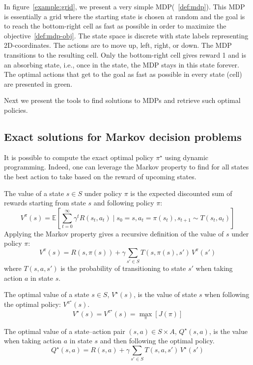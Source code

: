 In figure~\ref{example:grid}, we present a very simple MDP(~\ref{def:mdp}).
This MDP is essentially a grid where the starting state is chosen at random and the goal is to reach the bottom-right cell as fast as possible in order to maximize the objective~\ref{def:mdp-obj}.
The state space is discrete with state labels representing 2D-coordinates.
The actions are to move up, left, right, or down. The MDP transitions to the resulting cell. 
Only the bottom-right cell gives reward 1 and is an absorbing state, i.e., once in the state, the MDP stays in this state forever.
The optimal actions that get to the goal as fast as possible in every state (cell) are presented in green.

Next we present the tools to find solutions to MDPs and retrieve such optimal policies.

\subsection{Exact solutions for Markov decision problems}\label{sec:values}
It is possible to compute the exact optimal policy $\pi^\star$ using dynamic programming\cite{Bellman}.
Indeed, one can leverage the Markov property to find for all states the best action to take based on the reward of upcoming states.
\begin{definition}\label{def:vs} 
    The value of a state $s\in S$ under policy $\pi$ is the expected discounted sum of rewards starting from state $s$ and following policy $\pi$:
    $$V^\pi(s) = \mathbb{E}\left[\sum_{t=0}^{\infty} \gamma^t R(s_t, a_t) \mid s_0 = s, a_t = \pi(s_t), s_{t+1} \sim T(s_t, a_t)\right]$$
    Applying the Markov property gives a recursive definition of the value of $s$ under policy $\pi$:
    $$V^\pi(s) = R(s,\pi(s)) + \gamma \sum_{s' \in S} T(s,\pi(s),s')\,V^\pi(s')$$
    where $T(s,a,s')$ is the probability of transitioning to state $s'$ when taking action $a$ in state $s$.
\end{definition}
\begin{definition} The optimal value of a state $s\in S$, $V^\star(s)$, is the value of state $s$ when following the optimal policy: $V^{\pi^{\star}}(s)$.
    $$V^{\star}(s) = V^{\pi^{\star}}(s) = \underset{\pi}{\max}\left[J(\pi)\right]$$
\end{definition}
\begin{definition} The optimal value of a state–action pair $(s,a)\in S\times A$, $Q^\star(s,a)$, is the value when taking action $a$ in state $s$ and then following the optimal policy.
    $$Q^{\star}(s,a) = R(s, a) + \gamma\sum_{s'\in S} T(s,a,s')\,V^{\star}(s')$$
\end{definition}

